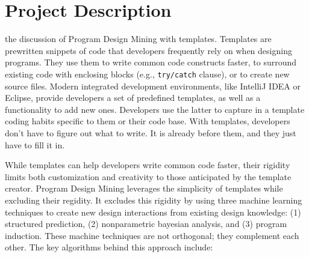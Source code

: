 \chapter{Project Description}{}
\label{sec:related}

 the discussion of Program Design Mining with templates. 
Templates are prewritten snippets of code that developers frequently rely on when 
designing programs. They use them to write common code constructs faster, to 
surround existing code with enclosing blocks (e.g., \texttt{try/catch} clause), or to 
create new source files. Modern integrated development environments, like IntelliJ IDEA 
or Eclipse, provide developers a set of predefined templates, as well as a functionality 
to add new ones. Developers use the latter to capture in a template coding habits 
specific to them or their code base. With templates, developers don't have to figure 
out what to write. It is already before them, and they just have to fill it in.  

While templates can help developers write common code faster, their rigidity limits 
both customization and creativity to those anticipated by the template creator. 
Program Design Mining leverages the simplicity of templates while excluding their 
regidity. It excludes this rigidity by using three machine learning techniques 
to create new design interactions from existing design knowledge: (1) structured 
prediction, (2) nonparametric bayesian analysis, and (3) program induction. These 
machine techniques are not orthogonal; they complement each other. The key algorithms 
behind this approach include:


%
%
%
%
%
%

